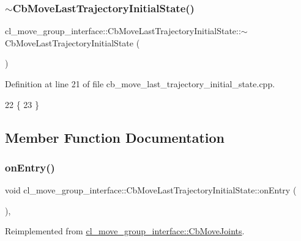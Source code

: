 \subsubsection{\texorpdfstring{$\sim$\+Cb\+Move\+Last\+Trajectory\+Initial\+State()}{~CbMoveLastTrajectoryInitialState()}}
{\footnotesize\ttfamily cl\+\_\+move\+\_\+group\+\_\+interface\+::\+Cb\+Move\+Last\+Trajectory\+Initial\+State\+::$\sim$\+Cb\+Move\+Last\+Trajectory\+Initial\+State (\begin{DoxyParamCaption}{ }\end{DoxyParamCaption})\hspace{0.3cm}{\ttfamily [virtual]}}



Definition at line 21 of file cb\+\_\+move\+\_\+last\+\_\+trajectory\+\_\+initial\+\_\+state.\+cpp.


\begin{DoxyCode}
22     \{
23     \}
\end{DoxyCode}


\subsection{Member Function Documentation}
\mbox{\label{classcl__move__group__interface_1_1CbMoveLastTrajectoryInitialState_ad51f4883ea1f7442875cda06c3d474c3}} 
\subsubsection{\texorpdfstring{on\+Entry()}{onEntry()}}
{\footnotesize\ttfamily void cl\+\_\+move\+\_\+group\+\_\+interface\+::\+Cb\+Move\+Last\+Trajectory\+Initial\+State\+::on\+Entry (\begin{DoxyParamCaption}{ }\end{DoxyParamCaption})\hspace{0.3cm}{\ttfamily [override]}, {\ttfamily [virtual]}}



Reimplemented from \hyperlink{classcl__move__group__interface_1_1CbMoveJoints_a23e4181af695aed9fa6bb4ae3f17fd76}{cl\+\_\+move\+\_\+group\+\_\+interface\+::\+Cb\+Move\+Joints}.




